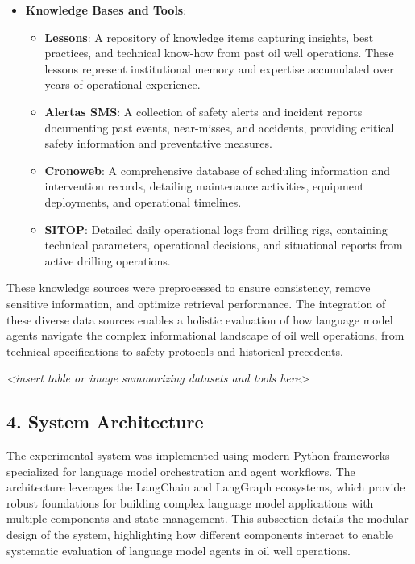             \begin{itemize}
                \item \textbf{Knowledge Bases and Tools}:
                \begin{itemize}
                    \item \textbf{Lessons}: A repository of knowledge items capturing insights, best practices, and technical know-how from past oil well operations. These lessons represent institutional memory and expertise accumulated over years of operational experience.
                    \item \textbf{Alertas SMS}: A collection of safety alerts and incident reports documenting past events, near-misses, and accidents, providing critical safety information and preventative measures.
                    \item \textbf{Cronoweb}: A comprehensive database of scheduling information and intervention records, detailing maintenance activities, equipment deployments, and operational timelines.
                    \item \textbf{SITOP}: Detailed daily operational logs from drilling rigs, containing technical parameters, operational decisions, and situational reports from active drilling operations.
                \end{itemize}
            \end{itemize}

            These knowledge sources were preprocessed to ensure consistency, remove sensitive information, and optimize retrieval performance. The integration of these diverse data sources enables a holistic evaluation of how language model agents navigate the complex informational landscape of oil well operations, from technical specifications to safety protocols and historical precedents.

            \textit{<insert table or image summarizing datasets and tools here>}

        \subsection{4. System Architecture}

            The experimental system was implemented using modern Python frameworks specialized for language model orchestration and agent workflows. The architecture leverages the LangChain and LangGraph ecosystems, which provide robust foundations for building complex language model applications with multiple components and state management. This subsection details the modular design of the system, highlighting how different components interact to enable systematic evaluation of language model agents in oil well operations.

